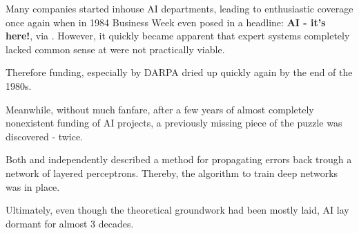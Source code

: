 Many companies started inhouse \ac{AI} departments, leading to enthusiastic coverage once again when in 1984 Business Week even posed in a headline: \textbf{AI - it's here!}, via \cite{schuchmann2019analyzing}. However, it quickly became apparent that expert systems completely lacked common sense at were not practically viable.

Therefore funding, especially by DARPA dried up quickly again by the end of the 1980s.

Meanwhile, without much fanfare, after a few years of almost completely nonexistent funding of AI projects, a previously missing piece of the puzzle was discovered - twice.

Both \cite{backprop} and \cite{backprop_werbos} independently described a method for propagating errors back trough a network of layered perceptrons. Thereby, the algorithm to train deep networks was in place.

Ultimately, even though the theoretical groundwork had been mostly laid, \ac{AI} lay dormant for almost 3 decades.
